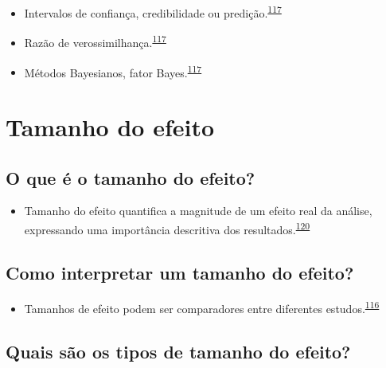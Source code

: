 \documentclass[
  a4paper,
]{book}
\providecommand{\tightlist}{%
  \setlength{\itemsep}{0pt}\setlength{\parskip}{0pt}}
\begin{document}
\begin{itemize}
\item
  Intervalos de confiança, credibilidade ou predição.\textsuperscript{\protect\hyperlink{ref-wasserstein2016}{117}}
\item
  Razão de verossimilhança.\textsuperscript{\protect\hyperlink{ref-wasserstein2016}{117}}
\item
  Métodos Bayesianos, fator Bayes.\textsuperscript{\protect\hyperlink{ref-wasserstein2016}{117}}
\end{itemize}

\hypertarget{tamanho-efeito}{%
\section{Tamanho do efeito}\label{tamanho-efeito}}

\hypertarget{o-que-uxe9-o-tamanho-do-efeito}{%
\subsection{O que é o tamanho do efeito?}\label{o-que-uxe9-o-tamanho-do-efeito}}

\begin{itemize}
\tightlist
\item
  Tamanho do efeito quantifica a magnitude de um efeito real da análise, expressando uma importância descritiva dos resultados.\textsuperscript{\protect\hyperlink{ref-Kim2015}{120}}
\end{itemize}

\hypertarget{como-interpretar-um-tamanho-do-efeito}{%
\subsection{Como interpretar um tamanho do efeito?}\label{como-interpretar-um-tamanho-do-efeito}}

\begin{itemize}
\tightlist
\item
  Tamanhos de efeito podem ser comparadores entre diferentes estudos.\textsuperscript{\protect\hyperlink{ref-Sullivan2012}{116}}
\end{itemize}

\hypertarget{quais-suxe3o-os-tipos-de-tamanho-do-efeito}{%
\subsection{Quais são os tipos de tamanho do efeito?}\label{quais-suxe3o-os-tipos-de-tamanho-do-efeito}}
\end{document}
